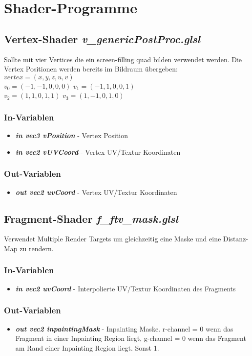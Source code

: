 \documentclass[10pt,a4paper,notitlepage]{article}
\begin{document}
\section{Shader-Programme}
\subsection{Vertex-Shader \textit{v\_genericPostProc.glsl}}
Sollte mit vier Vertices die ein screen-filling quad bilden verwendet werden. Die Vertex Positionen werden bereits
im Bildraum übergeben:\\
$vertex = (x,y,z,u,v)$\\
$v_0 = (-1,-1,0,0,0)$ \hspace{10pt} $v_1 = (-1,1,0,0,1)$\\
$v_2 = (1,1,0,1,1)$ \hspace{25pt} $v_3 = (1,-1,0,1,0)$
\subsubsection*{In-Variablen}
\begin{itemize}
\item \textbf{\textit{in vec3 vPosition}} - Vertex Position
\item \textbf{\textit{in vec2 vUVCoord}} - Vertex UV/Textur Koordinaten
\end{itemize}
\subsubsection*{Out-Variablen}
\begin{itemize}
\item \textbf{\textit{out vec2 uvCoord}} - Vertex UV/Textur Koordinaten
\end{itemize}

\subsection{Fragment-Shader \textit{f\_ftv\_mask.glsl}}
Verwendet Multiple Render Targets um gleichzeitig eine Maske und eine Distanz-Map zu rendern.
\subsubsection*{In-Variablen}
\begin{itemize}
\item \textbf{\textit{in vec2 uvCoord}} - Interpolierte UV/Textur Koordinaten des Fragments
\end{itemize}
\subsubsection*{Out-Variablen}
\begin{itemize}
\item \textbf{\textit{out vec2 inpaintingMask}} - Inpainting Maske. r-channel = 0 wenn das Fragment in einer Inpainting Region liegt, g-channel = 0 wenn das Fragment am Rand einer Inpainting Region liegt. Sonst 1.
\end{itemize}
\end{document}
